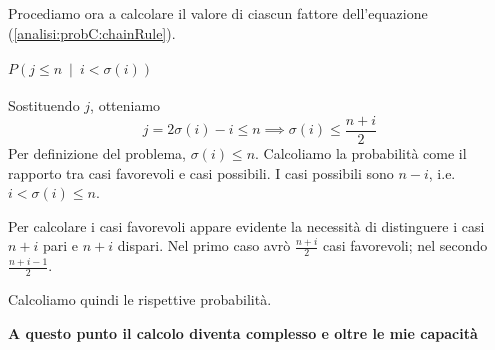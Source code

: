 \documentclass[../../../main.tex]{subfiles}
\begin{document}
Procediamo ora a calcolare il valore di ciascun fattore dell'equazione (\ref{analisi:probC:chainRule}).
\paragraph{$P(j \leq n\ \mid\ i < \sigma(i))$}
Sostituendo $j$, otteniamo
$$j = 2\sigma(i) - i \leq n \implies \sigma(i) \leq \frac{n+i}{2}$$
Per definizione del problema, $\sigma(i) \leq n$.
Calcoliamo la probabilità come il rapporto tra casi favorevoli e casi possibili.
I casi possibili sono $n-i$, i.e. $i < \sigma(i) \leq n$.

Per calcolare i casi favorevoli appare evidente la necessità di distinguere i casi $n+i$ pari e $n+i$ dispari.
Nel primo caso avrò $\frac{n+i}{2}$ casi favorevoli; nel secondo $\frac{n+i-1}{2}$.

Calcoliamo quindi le rispettive probabilità.

\dotfill

{\large\textbf{A questo punto il calcolo diventa complesso e oltre le mie capacità}}

\dotfill
\end{document}
